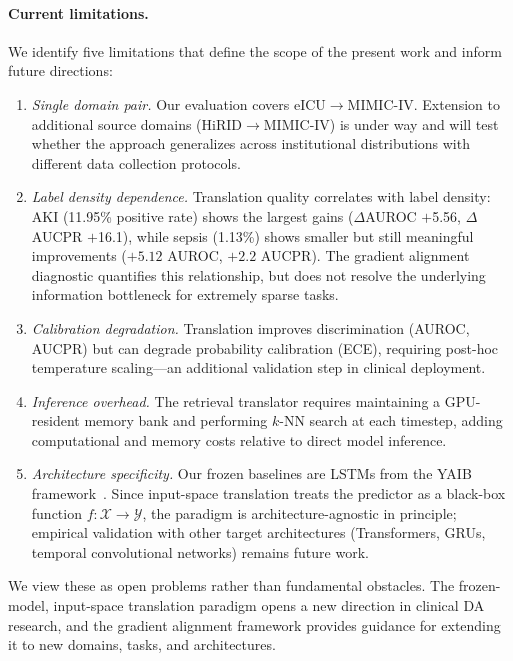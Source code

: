 \paragraph{Current limitations.}
We identify five limitations that define the scope of the present work and
inform future directions:
\begin{enumerate}[leftmargin=*,itemsep=1pt]
\item \textit{Single domain pair.}
Our evaluation covers eICU$\to$MIMIC-IV.
Extension to additional source domains (HiRID$\to$MIMIC-IV) is under way
and will test whether the approach generalizes across institutional
distributions with different data collection protocols.

\item \textit{Label density dependence.}
Translation quality correlates with label density:
AKI (11.95\% positive rate) shows the largest gains ($\Delta$AUROC $+$5.56, $\Delta$AUCPR $+$16.1),
while sepsis (1.13\%) shows smaller but still meaningful improvements ($+5.12$ AUROC, $+2.2$ AUCPR).
The gradient alignment diagnostic quantifies this relationship, but does
not resolve the underlying information bottleneck for extremely sparse tasks.

\item \textit{Calibration degradation.}
Translation improves discrimination (AUROC, AUCPR) but can degrade probability
calibration (ECE), requiring post-hoc temperature scaling---an additional
validation step in clinical deployment.

\item \textit{Inference overhead.}
The retrieval translator requires maintaining a GPU-resident memory bank and
performing $k$-NN search at each timestep, adding computational and memory
costs relative to direct model inference.

\item \textit{Architecture specificity.}
Our frozen baselines are LSTMs from the YAIB
framework~\cite{vandewater2024yaib}.
Since input-space translation treats the predictor as a black-box function
$f: \mathcal{X} \to \mathcal{Y}$, the paradigm is architecture-agnostic in
principle; empirical validation with other target architectures (Transformers,
GRUs, temporal convolutional networks) remains future work.
\end{enumerate}

\noindent
We view these as open problems rather than fundamental obstacles.
The frozen-model, input-space translation paradigm opens a new direction in
clinical DA research, and the gradient alignment framework provides guidance
for extending it to new domains, tasks, and architectures.
